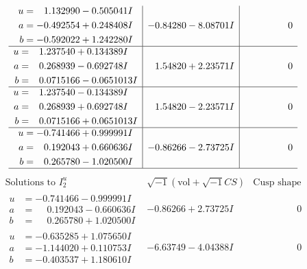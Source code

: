 \documentclass[1p]{elsarticle_modified}
\theoremstyle{definition}
\newcommand{\I}{\sqrt{-1}}
\begin{document}
$$\begin{array}{c|c|c}
\begin{aligned}
u &= \phantom{-}1.132990 - 0.505041 I \\
a &= -0.492554 + 0.248408 I \\
b &= -0.592022 + 1.242280 I\end{aligned}
 & -0.84280 - 8.08701 I & \phantom{-0.000000 } 0 \\ \hline\begin{aligned}
u &= \phantom{-}1.237540 + 0.134389 I \\
a &= \phantom{-}0.268939 - 0.692748 I \\
b &= \phantom{-}0.0715166 - 0.0651013 I\end{aligned}
 & \phantom{-}1.54820 + 2.23571 I & \phantom{-0.000000 } 0 \\ \hline\begin{aligned}
u &= \phantom{-}1.237540 - 0.134389 I \\
a &= \phantom{-}0.268939 + 0.692748 I \\
b &= \phantom{-}0.0715166 + 0.0651013 I\end{aligned}
 & \phantom{-}1.54820 - 2.23571 I & \phantom{-0.000000 } 0 \\ \hline\begin{aligned}
u &= -0.741466 + 0.999991 I \\
a &= \phantom{-}0.192043 + 0.660636 I \\
b &= \phantom{-}0.265780 - 1.020500 I\end{aligned}
 & -0.86266 - 2.73725 I & \phantom{-0.000000 } 0\\
 \hline 
 \end{array}$$\newpage$$\begin{array}{c|c|c}  
\text{Solutions to }I^u_{2}& \I (\text{vol} + \sqrt{-1}CS) & \text{Cusp shape}\\
 \hline 
\begin{aligned}
u &= -0.741466 - 0.999991 I \\
a &= \phantom{-}0.192043 - 0.660636 I \\
b &= \phantom{-}0.265780 + 1.020500 I\end{aligned}
 & -0.86266 + 2.73725 I & \phantom{-0.000000 } 0 \\ \hline\begin{aligned}
u &= -0.635285 + 1.075650 I \\
a &= -1.144020 + 0.110753 I \\
b &= -0.403537 + 1.180610 I\end{aligned}
 & -6.63749 - 4.04388 I & \phantom{-0.000000 } 0 \\ \hline\begin{aligned}

\end{aligned}
\end{array}$$
\end{document}
